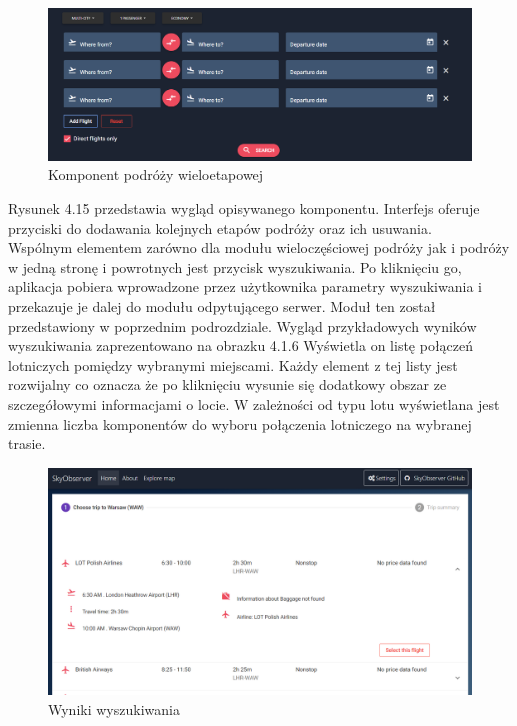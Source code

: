 \documentclass[12pt, twoside]{report}
\begin{document}
\begin{figure}[!ht]
\centering
\includegraphics[scale=0.40, keepaspectratio]{multi_panel.png}
\caption{Komponent podróży wieloetapowej}
\label{fig:multi_panel}
\end{figure}
\noindent Rysunek 4.15 przedstawia wygląd opisywanego komponentu. Interfejs oferuje przyciski do dodawania kolejnych etapów podróży oraz ich usuwania. \\ \indent
Wspólnym elementem zarówno dla modułu wieloczęściowej podróży jak i podróży w jedną stronę i powrotnych jest przycisk wyszukiwania. Po kliknięciu go, aplikacja pobiera wprowadzone przez użytkownika parametry wyszukiwania i przekazuje je dalej do modułu odpytującego serwer. Moduł ten został przedstawiony w poprzednim podrozdziale. Wygląd przykładowych wyników wyszukiwania zaprezentowano na obrazku 4.1.6 Wyświetla on listę połączeń lotniczych pomiędzy wybranymi miejscami. Każdy element z tej listy jest rozwijalny co oznacza że po kliknięciu wysunie się dodatkowy obszar ze szczegółowymi informacjami o locie. W zależności od typu lotu wyświetlana jest zmienna liczba komponentów do wyboru połączenia lotniczego na wybranej trasie.
\begin{figure}[!ht]
\centering
\includegraphics[scale=0.40, keepaspectratio]{result_component.png}
\caption{Wyniki wyszukiwania}
\label{fig:result_component}
\end{figure}
\end{document}
